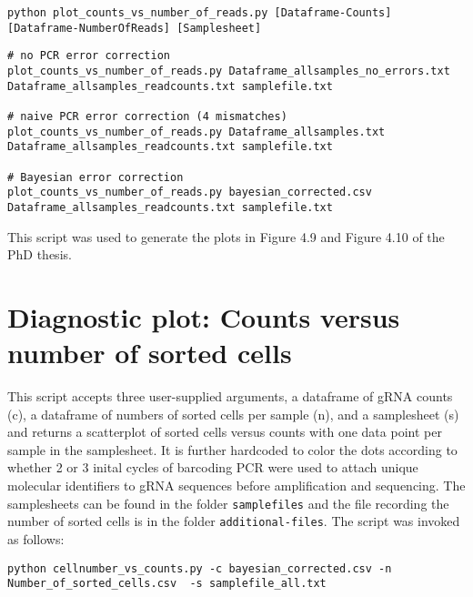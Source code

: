 \begin{small}\begin{lstlisting}
python plot_counts_vs_number_of_reads.py [Dataframe-Counts] [Dataframe-NumberOfReads] [Samplesheet]
\end{lstlisting}\end{small}

\begin{small}\begin{lstlisting}
# no PCR error correction
plot_counts_vs_number_of_reads.py Dataframe_allsamples_no_errors.txt Dataframe_allsamples_readcounts.txt samplefile.txt

# naive PCR error correction (4 mismatches)
plot_counts_vs_number_of_reads.py Dataframe_allsamples.txt Dataframe_allsamples_readcounts.txt samplefile.txt

# Bayesian error correction
plot_counts_vs_number_of_reads.py bayesian_corrected.csv Dataframe_allsamples_readcounts.txt samplefile.txt
\end{lstlisting}\end{small}

This script was used to generate the plots in Figure 4.9 and Figure 4.10 of the PhD thesis. 

\section{Diagnostic plot: Counts versus number of sorted cells}

This script accepts three user-supplied arguments, a dataframe of gRNA counts (c), a dataframe of numbers of sorted cells per sample (n), and a samplesheet (s) and returns a scatterplot of sorted cells versus counts with one data point per sample in the samplesheet. It is further hardcoded to color the dots according to whether 2 or 3 inital cycles of barcoding PCR were used to attach unique molecular identifiers to gRNA sequences before amplification and sequencing. The samplesheets can be found in the folder \verb|samplefiles| and the file recording the number of sorted cells is in the folder \verb|additional-files|. The script was invoked as follows:

\begin{small}\begin{lstlisting}
python cellnumber_vs_counts.py -c bayesian_corrected.csv -n Number_of_sorted_cells.csv  -s samplefile_all.txt 
\end{lstlisting}\end{small}

